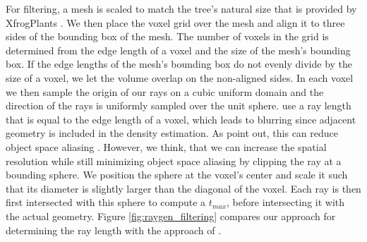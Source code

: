 For filtering, a mesh is scaled to match the tree's natural size that is provided by XfrogPlants \cite{xfrogplants}.
We then place the voxel grid over the mesh and align it to three sides of the bounding box of the mesh.
The number of voxels in the grid is determined from the edge length of a voxel and the size of the mesh's bounding box.
If the edge lengths of the mesh's bounding box do not evenly divide by the size of a voxel, we let the volume overlap on the non-aligned sides.
In each voxel we then sample the origin of our rays on a cubic uniform domain and the direction of the rays is uniformly sampled over the unit sphere.
\citeauthor{hybrid_mesh_volume_lods} use a ray length that is equal to the edge length of a voxel, which leads to blurring since adjacent geometry is included in the density estimation.
As \citeauthor{wang_object_space_aliasing} point out, this can reduce object space aliasing \cite{wang_object_space_aliasing}.
However, we think, that we can increase the spatial resolution while still minimizing object space aliasing by clipping the ray at a bounding sphere.
We position the sphere at the voxel's center and scale it such that its diameter is slightly larger than the diagonal of the voxel.
Each ray is then first intersected with this sphere to compute a $t_{max}$, before intersecting it with the actual geometry.
Figure \ref{fig:raygen_filtering} compares our approach for determining the ray length with the approach of \citeauthor{hybrid_mesh_volume_lods} \cite{hybrid_mesh_volume_lods}.

